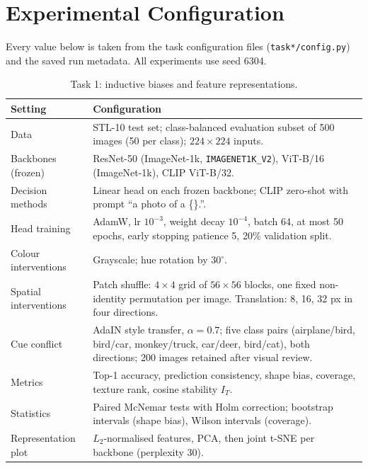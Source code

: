 \clearpage
\section{Experimental Configuration}
\label{app:setup}

Every value below is taken from the task configuration files (\texttt{task*/config.py}) and the saved run metadata. All experiments use seed 6304.

\begin{table}[h]
  \caption{Task 1: inductive biases and feature representations.}
  \label{tab:setup_task1}
  \centering
  \small
  \begin{tabular}{@{}p{}p{}@{}}
    \toprule
    \textbf{Setting} & \textbf{Configuration} \\
    \midrule
    Data & STL-10 test set; class-balanced evaluation subset of 500 images (50 per class); $224\times224$ inputs. \\
    Backbones (frozen) & ResNet-50 (ImageNet-1k, \texttt{IMAGENET1K\_V2}), ViT-B/16 (ImageNet-1k), CLIP ViT-B/32. \\
    Decision methods & Linear head on each frozen backbone; CLIP zero-shot with prompt ``a photo of a \{\}.''. \\
    Head training & AdamW, lr $10^{-3}$, weight decay $10^{-4}$, batch 64, at most 50 epochs, early stopping patience 5, 20\% validation split. \\
    Colour interventions & Grayscale; hue rotation by $30^{\circ}$. \\
    Spatial interventions & Patch shuffle: $4\times4$ grid of $56\times56$ blocks, one fixed non-identity permutation per image. Translation: 8, 16, 32 px in four directions. \\
    Cue conflict & AdaIN style transfer, $\alpha=0.7$; five class pairs (airplane/bird, bird/car, monkey/truck, car/deer, bird/cat), both directions; 200 images retained after visual review. \\
    Metrics & Top-1 accuracy, prediction consistency, shape bias, coverage, texture rank, cosine stability $I_T$. \\
    Statistics & Paired McNemar tests with Holm correction; bootstrap intervals (shape bias), Wilson intervals (coverage). \\
    Representation plot & $L_2$-normalised features, PCA, then joint t-SNE per backbone (perplexity 30). \\
    \bottomrule
  \end{tabular}
\end{table}

